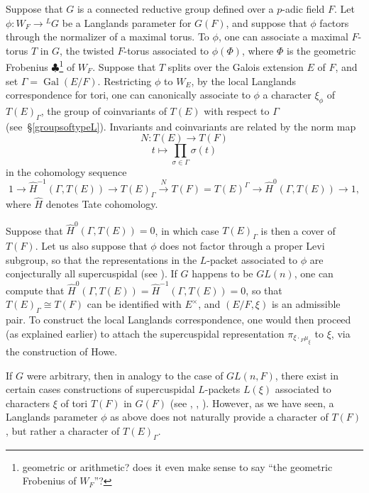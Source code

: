 \documentclass[11pt]{amsart}
\theoremstyle{plain}
\newcommand{\MAxxx}[1]{$\clubsuit$\footnote{#1}}
\DeclareMathOperator{\Gal}{Gal}
\begin{document}
Suppose that $G$ is a connected reductive group defined over a $p$-adic field $F$.  Let
$\phi : W_F \rightarrow {}^L G$ be a Langlands parameter for $G(F)$, and suppose that $\phi$ factors through the
normalizer of a maximal torus. To $\phi$, one can associate a maximal $F$-torus $T$ in $G$, the twisted $F$-torus associated to $\phi(\Phi)$, where $\Phi$ is the geometric Frobenius \MAxxx{geometric or arithmetic?  does it even make sense to say ``the geometric Frobenius of $W_F$''?} of $W_F$.  Suppose that $T$
splits over the Galois extension $E$ of $F$, and set $\Gamma = \Gal(E/F)$.  Restricting $\phi$ to $W_E$, by the local Langlands correspondence for tori,
one can canonically associate to $\phi$ a character $\xi_{\phi}$ of $T(E)_{\Gamma}$,
the group of coinvariants of $T(E)$ with respect to $\Gamma$ (see~\S\ref{groupsoftypeL}).
Invariants and coinvariants are related by the norm map
$$N : T(E) \rightarrow T(F)$$ $$t \mapsto \displaystyle\prod_{\sigma \in \Gamma} \sigma(t)$$
in the cohomology sequence
$$1 \rightarrow \hat{H}^{-1}(\Gamma,T(E)) \rightarrow T(E)_{\Gamma} \xrightarrow{N} T(F)
= T(E)^{\Gamma} \rightarrow \hat{H}^0(\Gamma,T(E)) \rightarrow 1,$$ where $\hat{H}$ denotes Tate cohomology.

Suppose that $\hat{H}^0(\Gamma, T(E)) = 0$, in which case $T(E)_{\Gamma}$ is then a cover of $T(F)$.  Let us also suppose that $\phi$ does not factor through a proper Levi subgroup, so that the representations in the $L$-packet associated to $\phi$ are conjecturally all supercuspidal (see \cite[\S 3.5]{debackerreeder}).  If $G$ happens to be $GL(n)$, one can compute that $\hat{H}^{0}(\Gamma, T(E)) = \hat{H}^{-1}(\Gamma, T(E)) = 0$, so that $T(E)_{\Gamma} \cong T(F)$ can be identified with $E^{\times}$, and $(E/F, \xi)$ is an admissible pair.  To construct the local Langlands correspondence, one would then proceed (as explained earlier) to attach the supercuspidal representation $\pi_{\xi \cdot {}_F \mu_{\xi}}$ to $\xi$, via the construction of Howe.

If $G$ were arbitrary, then in analogy to the case of $GL(n,F)$, there exist in certain cases constructions of supercuspidal $L$-packets $L(\xi)$ associated to characters $\xi$ of tori $T(F)$ in $G(F)$ (see \cite{debackerreeder}, \cite{kaletha}, \cite{reeder}).  However, as we have seen, a Langlands parameter $\phi$ as above does not naturally provide a character of $T(F)$, but rather a character of $T(E)_{\Gamma}$.
\end{document}
